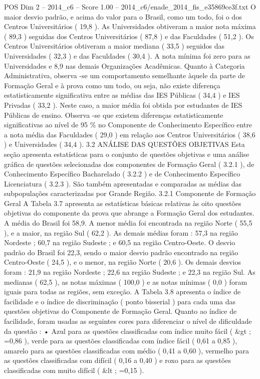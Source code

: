 \begin{textsample}{POS Dim 2 – 2014\_c6 – Score 1.00 – 2014\_c6/enade\_2014\_fis\_e35869ce3f.txt}
O maior desvio padrão, e acima do valor para o Brasil, como um todo, foi o dos Centros Universitários ( 19,8 ).
As Universidades obtiveram a maior nota máxima ( 89,3 ) seguidas dos Centros Universitários ( 87,8 ) e das Faculdades ( 51,2 ).
Os Centros Universitários obtiveram a maior mediana ( 33,5 ) seguidos das Universidades ( 32,3 ) e das Faculdades ( 30,4 ).
A nota mínima foi zero para as Universidades e 8,9 nas demais Organizações Acadêmicas.
Quanto à Categoria Administrativa, observa -se um comportamento semelhante àquele da parte de Formação Geral e à prova como um todo, ou seja, não existe diferença estatisticamente significativa entre as médias das IES Públicas ( 34,4 ) e IES Privadas ( 33,2 ).
Neste caso, a maior média foi obtida por estudantes de IES Públicas de ensino.
Observa -se que existem diferenças estatisticamente significativas ao nível de 95 \% no Componente de Conhecimento Específico entre a nota média das Faculdades ( 29,0 ) em relação aos Centros Universitários ( 38,6 ) e Universidades ( 34,4 ). 3.2 ANÁLISE DAS QUESTÕES OBJETIVAS Esta seção apresenta estatísticas para o conjunto de questões objetivas e uma análise gráfica de questões selecionadas dos componentes de Formação Geral ( 3.2.1 ), de Conhecimento Específico Bacharelado ( 3.2.2 ) e de Conhecimento Específico Licenciatura ( 3.2.3 ).
São também apresentadas e comparadas as médias das subpopulações caracterizadas por Grande Região. 3.2.1 Componente de Formação Geral A Tabela 3.7 apresenta as estatísticas básicas relativas às oito questões objetivas do componente da prova que abrange a Formação Geral dos estudantes.
A média do Brasil foi 58,9.
A menor média foi encontrada na região Norte ( 55,5 ), e a maior, na região Sul ( 62,2 ).
As demais médias foram : 57,3 na região Nordeste ; 60,7 na região Sudeste ; e 60,5 na região Centro-Oeste.
O desvio padrão do Brasil foi 22,3, sendo o maior desvio padrão encontrado na região Centro-Oeste ( 24,5 ), e o menor, na região Norte ( 20,6 ).
Os demais desvios foram : 21,9 na região Nordeste ; 22,6 na região Sudeste ; e 22,3 na região Sul.
As medianas ( 62,5 ), as notas máximas ( 100,0 ) e as notas mínimas ( 0,0 ) foram iguais para todas as regiões, sem exceção.
A Tabela 3.8 apresenta o índice de facilidade e o índice de discriminação ( ponto bisserial ) para cada uma das questões objetivas do Componente de Formação Geral.
Quanto ao índice de facilidade, foram usadas as seguintes cores para diferenciar o nível de dificuldade da questão : • Azul para as questões classificadas com índice muito fácil ( \&gt ; =0,86 ), verde para as questões classificadas com índice fácil ( 0,61 a 0,85 ), amarelo para as questões classificadas com médio ( 0,41 a 0,60 ), vermelho para as questões classificadas com difícil ( 0,16 a 0,40 ) e roxo para as questões classificadas com muito difícil ( \&lt ; =0,15 ).

\end{textsample}
